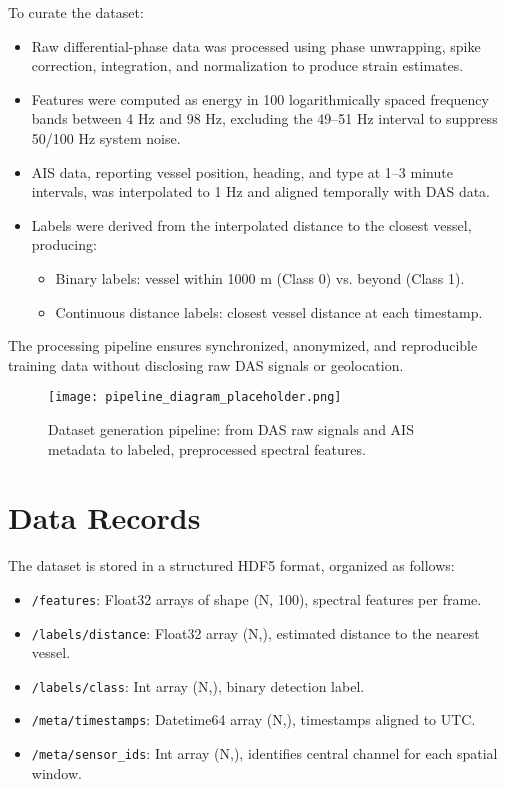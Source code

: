 \documentclass[11pt]{article}
\begin{document}
To curate the dataset:
\begin{itemize}
  \item Raw differential-phase data was processed using phase unwrapping, spike correction, integration, and normalization to produce strain estimates.
  \item Features were computed as energy in 100 logarithmically spaced frequency bands between 4 Hz and 98 Hz, excluding the 49–51 Hz interval to suppress 50/100 Hz system noise.
  \item AIS data, reporting vessel position, heading, and type at 1–3 minute intervals, was interpolated to 1 Hz and aligned temporally with DAS data.
  \item Labels were derived from the interpolated distance to the closest vessel, producing:
    \begin{itemize}
      \item Binary labels: vessel within 1000 m (Class 0) vs. beyond (Class 1).
      \item Continuous distance labels: closest vessel distance at each timestamp.
    \end{itemize}
\end{itemize}

The processing pipeline ensures synchronized, anonymized, and reproducible training data without disclosing raw DAS signals or geolocation.

\begin{figure}[H]
  \centering
  \texttt{[image: pipeline\_diagram\_placeholder.png]}
  \caption{Dataset generation pipeline: from DAS raw signals and AIS metadata to labeled, preprocessed spectral features.}
\end{figure}

\section*{Data Records}
The dataset is stored in a structured HDF5 format, organized as follows:
\begin{itemize}
  \item \texttt{/features}: Float32 arrays of shape (N, 100), spectral features per frame.
  \item \texttt{/labels/distance}: Float32 array (N,), estimated distance to the nearest vessel.
  \item \texttt{/labels/class}: Int array (N,), binary detection label.
  \item \texttt{/meta/timestamps}: Datetime64 array (N,), timestamps aligned to UTC.
  \item \texttt{/meta/sensor_ids}: Int array (N,), identifies central channel for each spatial window.
\end{itemize}
\end{document}
